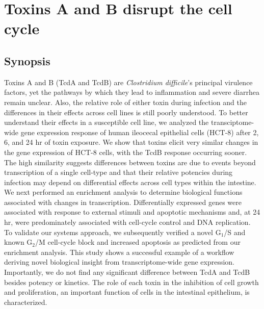 
\chapter{ Toxins A and B disrupt the cell cycle }\label{chapter:bmc}

\section{Synopsis}
Toxins A and B (TcdA and TcdB) are \textit{Clostridium difficile}'s 
principal virulence factors, yet the pathways by which they lead 
to inflammation and severe diarrhea remain unclear. Also, the 
relative role of either toxin during infection and the differences 
in their effects across cell lines is still poorly understood. 
To better understand their effects in a susceptible cell line, 
we analyzed the transciptome-wide gene expression response of human 
ileocecal epithelial cells (HCT-8) after 2, 6, and 24 hr of toxin exposure. 
We show that toxins elicit very similar changes in the gene 
expression of HCT-8 cells, with the TcdB response occurring sooner. 
The high similarity suggests differences between toxins are due 
to events beyond transcription of a single cell-type and that 
their relative potencies during infection may depend on differential 
effects across cell types within the intestine. We next performed an 
enrichment analysis to determine biological functions associated with 
changes in transcription. Differentially expressed genes were 
associated with response to external stimuli and apoptotic 
mechanisms and, at 24 hr, were predominately associated with 
cell-cycle control and DNA replication. To validate our systems 
approach, we subsequently verified a novel G$_{\text{1}}$/S and 
known G$_{\text{2}}$/M cell-cycle block and increased apoptosis 
as predicted from our enrichment analysis. 
This study shows a successful example of a workflow 
deriving novel biological insight from transcriptome-wide 
gene expression. Importantly, we do not find any significant 
difference between TcdA and TcdB besides potency or kinetics. 
The role of each toxin in the inhibition of cell growth and 
proliferation, an important function of cells in the 
intestinal epithelium, is characterized.


